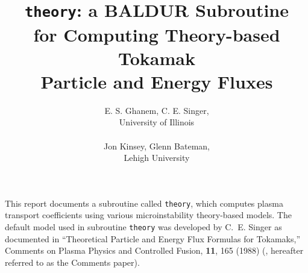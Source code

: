 %
%
\headheight 0pt \headsep 0pt  \topmargin 0pt  \oddsidemargin 0pt
\textheight 9.0in \textwidth 6.5in

\title{ {\tt theory}: a BALDUR Subroutine \\ %
 for Computing Theory-based Tokamak \\
 Particle and Energy Fluxes}     %
\author{E. S. Ghanem, C. E. Singer, \\ University of Illinois \\ \\
        Jon Kinsey, Glenn Bateman,  \\ Lehigh University
        }
\maketitle                 %

This report documents a subroutine called {\tt theory}, which computes plasma 
transport coefficients using various microinstability theory-based models.
The default model used in subroutine {\tt theory} was developed by
C.~E. Singer as documented in
``Theoretical Particle and Energy Flux Formulas for Tokamaks,''
Comments on Plasma Physics and Controlled Fusion, {\bf 11}, 165 (1988)
(\cite{Comments}, hereafter referred to as the Comments paper).

